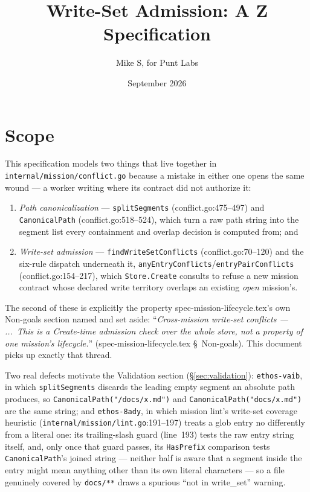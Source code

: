 \documentclass[a4paper,10pt,fleqn]{article}
\newcommand{\fpath}[1]{\texttt{#1}}
\newcommand{\field}[1]{\texttt{#1}}
\begin{document}
\title{Write-Set Admission: A Z Specification}
\author{Mike S, for Punt Labs}
\date{September 2026}
\maketitle
\tableofcontents
\newpage

\section{Scope}
\label{sec:scope}

This specification models two things that live together in
\fpath{internal/mission/conflict.go} because a mistake in either one
opens the same wound --- a worker writing where its contract did not
authorize it:

\begin{enumerate}
  \item \emph{Path canonicalization} --- \field{splitSegments}
    (conflict.go:475--497) and \field{CanonicalPath}
    (conflict.go:518--524), which turn a raw path string into the
    segment list every containment and overlap decision is computed
    from; and
  \item \emph{Write-set admission} --- \field{findWriteSetConflicts}
    (conflict.go:70--120) and the six-rule dispatch underneath it,
    \field{anyEntryConflicts}/\field{entryPairConflicts}
    (conflict.go:154--217), which \field{Store.Create} consults to
    refuse a new mission contract whose declared write territory
    overlaps an existing \emph{open} mission's.
\end{enumerate}

The second of these is explicitly the property
spec-mission-lifecycle.tex's own Non-goals section named and set
aside: ``\emph{Cross-mission write-set conflicts --- ...\ This is a
Create-time admission check over the whole store, not a property of
one mission's lifecycle.}'' (spec-mission-lifecycle.tex
\S~Non-goals). This document picks up exactly that thread.

Two real defects motivate the Validation section
(\S\ref{sec:validation}): \field{ethos-vaib}, in which
\field{splitSegments} discards the leading empty segment an absolute
path produces, so \field{CanonicalPath("/docs/x.md")} and
\field{CanonicalPath("docs/x.md")} are the same string; and
\field{ethos-8ady}, in which mission lint's write-set coverage
heuristic (\fpath{internal/mission/lint.go}:191--197) treats a glob
entry no differently from a literal one: its trailing-slash guard
(line~193) tests the raw entry string itself, and, only once that
guard passes, its \field{HasPrefix} comparison tests
\field{CanonicalPath}'s joined string --- neither half is aware that
a segment inside the entry might mean anything other than its own
literal characters --- so a file genuinely covered by
\texttt{docs/**} draws a spurious ``not in write\_set'' warning.
\end{document}
